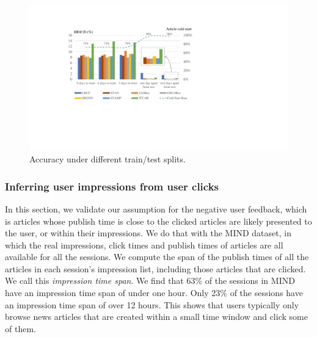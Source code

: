 \begin{figure}[th]
  \centering
  \includegraphics[width=\columnwidth]{fig/diff_day_len.pdf}
  \caption{Accuracy under different train/test splits.}
  \label{fig:trainlen}
\end{figure}

\subsubsection{Inferring user impressions from user clicks}
In this section, we validate our assumption for the negative user feedback,
which is articles whose publish time is close to the clicked articles are
likely presented to the user, or within their impressions.
We do that with the MIND dataset, in which the real impressions, click times and 
publish times of articles are all available for all the sessions. 
We compute the span of the publish times of all the articles in
each session's impression list, including those articles that are clicked. 
We call this \textit{impression time span}.
We find that 63\% of the sessions in MIND have an impression time span of under
one hour. Only 23\% of the sessions have an impression time span of over 12 hours.
This shows that users typically only browse news articles that are created within a small 
time window and click some of them.

